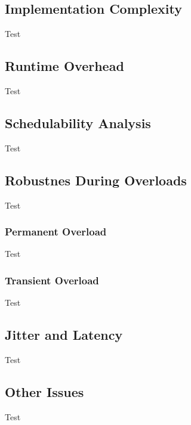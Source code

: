 \subsection{Implementation Complexity}
\begin{frame}{\subsecname}
	Test
\end{frame}
\subsection{Runtime Overhead}
\begin{frame}{\subsecname}
	Test
\end{frame}
\subsection{Schedulability Analysis}
\begin{frame}{\subsecname}
	Test
\end{frame}
\subsection{Robustnes During Overloads}
\begin{frame}{\subsecname}
	Test
\end{frame}
\subsubsection{Permanent Overload}
\begin{frame}{\subsecname}
	Test
\end{frame}
\subsubsection{Transient Overload}
\begin{frame}{\subsecname}
	Test
\end{frame}
\subsection{Jitter and Latency}
\begin{frame}{\subsecname}
	Test
\end{frame}

\subsection{Other Issues}

\begin{frame}{\subsecname}
	Test
\end{frame}